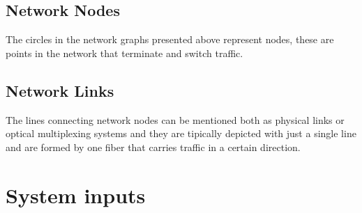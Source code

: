 \subsection{Network Nodes} 
The circles in the network graphs presented above represent nodes, these are points in the network that terminate and switch traffic.
\subsection{Network Links}
The lines connecting network nodes can be mentioned both as physical links or optical multiplexing systems and they are tipically depicted with just a single line and are formed by one fiber that carries traffic in a certain direction. 

\section{System inputs}
